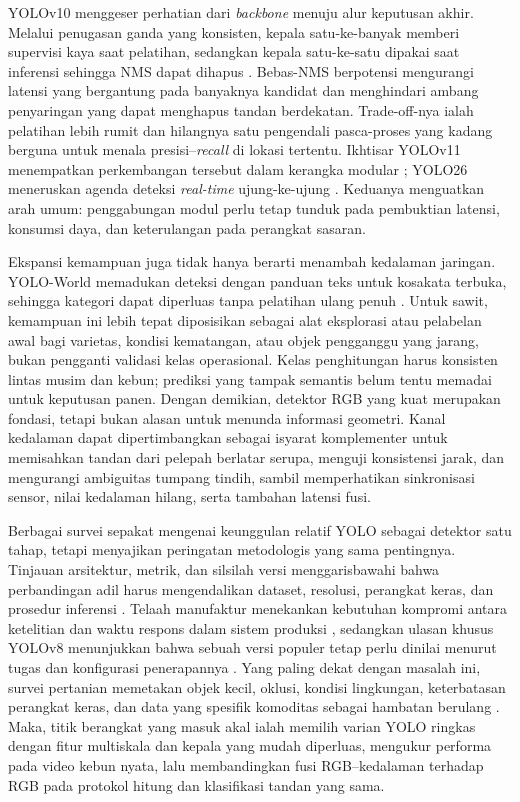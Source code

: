 YOLOv10 menggeser perhatian dari \textit{backbone} menuju alur keputusan akhir. Melalui penugasan ganda yang konsisten, kepala satu-ke-banyak memberi supervisi kaya saat pelatihan, sedangkan kepala satu-ke-satu dipakai saat inferensi sehingga NMS dapat dihapus \cite{wang2024yolov10}. Bebas-NMS berpotensi mengurangi latensi yang bergantung pada banyaknya kandidat dan menghindari ambang penyaringan yang dapat menghapus tandan berdekatan. Trade-off-nya ialah pelatihan lebih rumit dan hilangnya satu pengendali pasca-proses yang kadang berguna untuk menala presisi--\textit{recall} di lokasi tertentu. Ikhtisar YOLOv11 menempatkan perkembangan tersebut dalam kerangka modular \cite{khanam2024yolov11}; YOLO26 meneruskan agenda deteksi \textit{real-time} ujung-ke-ujung \cite{sapkota2025yolo26}. Keduanya menguatkan arah umum: penggabungan modul perlu tetap tunduk pada pembuktian latensi, konsumsi daya, dan keterulangan pada perangkat sasaran.

Ekspansi kemampuan juga tidak hanya berarti menambah kedalaman jaringan. YOLO-World memadukan deteksi dengan panduan teks untuk kosakata terbuka, sehingga kategori dapat diperluas tanpa pelatihan ulang penuh \cite{cheng2024yoloworld}. Untuk sawit, kemampuan ini lebih tepat diposisikan sebagai alat eksplorasi atau pelabelan awal bagi varietas, kondisi kematangan, atau objek pengganggu yang jarang, bukan pengganti validasi kelas operasional. Kelas penghitungan harus konsisten lintas musim dan kebun; prediksi yang tampak semantis belum tentu memadai untuk keputusan panen. Dengan demikian, detektor RGB yang kuat merupakan fondasi, tetapi bukan alasan untuk menunda informasi geometri. Kanal kedalaman dapat dipertimbangkan sebagai isyarat komplementer untuk memisahkan tandan dari pelepah berlatar serupa, menguji konsistensi jarak, dan mengurangi ambiguitas tumpang tindih, sambil memperhatikan sinkronisasi sensor, nilai kedalaman hilang, serta tambahan latensi fusi.

Berbagai survei sepakat mengenai keunggulan relatif YOLO sebagai detektor satu tahap, tetapi menyajikan peringatan metodologis yang sama pentingnya. Tinjauan arsitektur, metrik, dan silsilah versi menggarisbawahi bahwa perbandingan adil harus mengendalikan dataset, resolusi, perangkat keras, dan prosedur inferensi \cite{terven2023yolo,jiang2022yoloreview,ali2024yoloreview,vijayakumar2024yolo,alif2024yoloevolution,diwan2023yolo}. Telaah manufaktur menekankan kebutuhan kompromi antara ketelitian dan waktu respons dalam sistem produksi \cite{hussain2023yolo}, sedangkan ulasan khusus YOLOv8 menunjukkan bahwa sebuah versi populer tetap perlu dinilai menurut tugas dan konfigurasi penerapannya \cite{sohan2024yolov8review}. Yang paling dekat dengan masalah ini, survei pertanian memetakan objek kecil, oklusi, kondisi lingkungan, keterbatasan perangkat keras, dan data yang spesifik komoditas sebagai hambatan berulang \cite{sapkota2024yoloagri}. Maka, titik berangkat yang masuk akal ialah memilih varian YOLO ringkas dengan fitur multiskala dan kepala yang mudah diperluas, mengukur performa pada video kebun nyata, lalu membandingkan fusi RGB--kedalaman terhadap RGB pada protokol hitung dan klasifikasi tandan yang sama.

